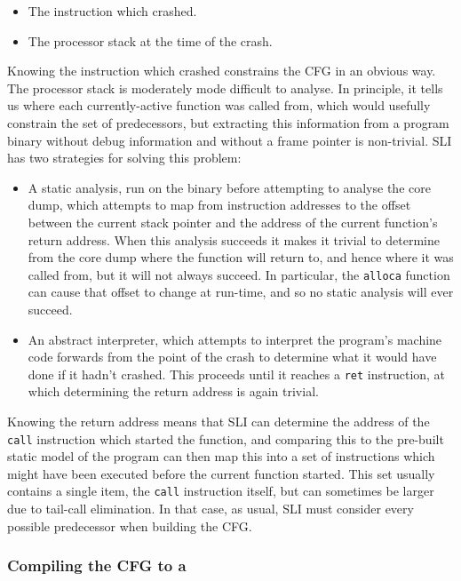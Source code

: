 \begin{itemize}
\item
  The instruction which crashed.
\item
  The processor stack at the time of the crash.
\end{itemize}

Knowing the instruction which crashed constrains the CFG in an obvious way.
The processor stack is moderately mode difficult to analyse.
In principle, it tells us where each currently-active function was called from, which would usefully constrain the set of predecessors, but extracting this information from a program binary without debug information and without a frame pointer is non-trivial.
SLI has two strategies for solving this problem:

\begin{itemize}
\item
  A static analysis, run on the binary before attempting to analyse the core dump, which attempts to map from instruction addresses to the offset between the current stack pointer and the address of the current function's return address.
  When this analysis succeeds it makes it trivial to determine from the core dump where the function will return to, and hence where it was called from, but it will not always succeed.
  In particular, the \verb|alloca| function can cause that offset to change at run-time, and so no static analysis will ever succeed.
\item
  An abstract interpreter, which attempts to interpret the program's machine code forwards from the point of the crash to determine what it would have done if it hadn't crashed.
  This proceeds until it reaches a \verb|ret| instruction, at which determining the return address is again trivial.
\end{itemize}

Knowing the return address means that SLI can determine the address of the \verb|call| instruction which started the function, and comparing this to the pre-built static model of the program can then map this into a set of instructions which might have been executed before the current function started.
This set usually contains a single item, the \verb|call| instruction itself, but can sometimes be larger due to tail-call elimination.
In that case, as usual, SLI must consider every possible predecessor when building the CFG.

\subsubsection{Compiling the CFG to a \StateMachine}


